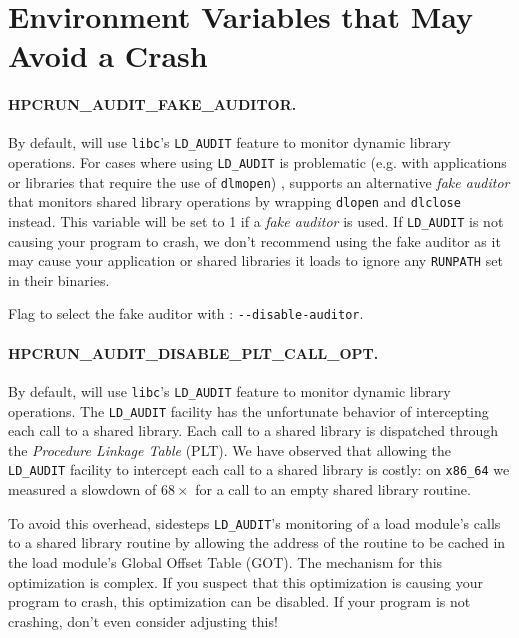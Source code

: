 \section{Environment Variables that May Avoid a Crash}

\paragraph{HPCRUN\_AUDIT\_FAKE\_AUDITOR.}

By default, \hpcrun{} will use \verb|libc|'s \verb|LD_AUDIT| feature to monitor dynamic library operations. 
For cases where using \verb|LD_AUDIT| is problematic (e.g. with applications or libraries that require the use of {\tt dlmopen}) , 
\hpcrun{} supports an alternative {\em fake auditor} that monitors shared library operations by wrapping {\tt dlopen} and {\tt dlclose} instead. This variable will be set to 1 if a {\em fake auditor} is used. 
If \verb|LD_AUDIT| is not causing your program to crash, we don't recommend using the fake auditor as it may cause your application or shared libraries it loads to ignore any {\tt RUNPATH} set in their binaries.

\parg
Flag to select the fake auditor with \hpcrun: \verb|--disable-auditor|.

\paragraph{HPCRUN\_AUDIT\_DISABLE\_PLT\_CALL\_OPT.}

By default, \hpcrun{} will use \verb|libc|'s \verb|LD_AUDIT| feature to monitor dynamic library operations. The \verb|LD_AUDIT| facility has the unfortunate behavior of intercepting each call to a shared library. Each call to a shared library is dispatched through  the {\em Procedure Linkage Table} (PLT). We have observed that allowing the \verb|LD_AUDIT| facility to intercept each call to a shared library is costly: on {\tt x86\_64} we measured a slowdown of $68\times$ for a call to an empty shared library routine. 

To avoid this overhead, \hpcrun{} sidesteps \verb|LD_AUDIT|'s monitoring of a load module's calls to a shared library routine by allowing the address of the routine to be cached in the load module's Global Offset Table (GOT). The mechanism for this optimization is complex. If you suspect that this optimization is causing your program to crash, this optimization can be disabled. If your program is not crashing, don't even consider adjusting this!

